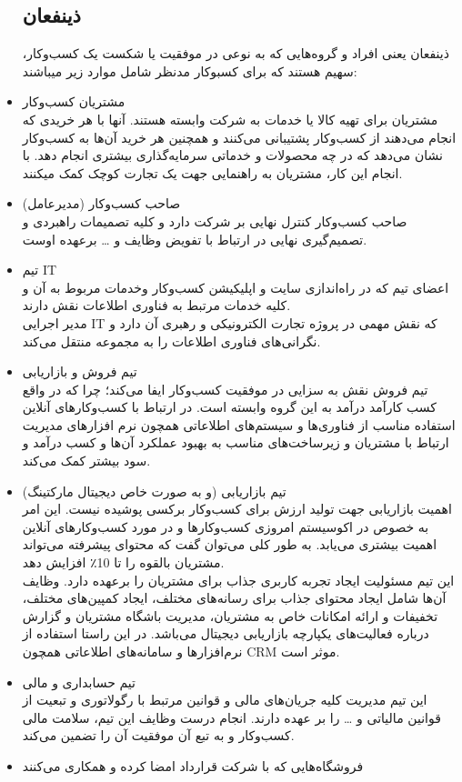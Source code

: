 \documentclass[14pt]{article}
\begin{document}
\begin{flushright}
\begin{itemize}
\subsection{ ذینفعان}
ذینفعان یعنی افراد و گروه‌هایی که به نوعی در موفقیت یا شکست یک کسب‌وکار، سهیم هستند که برای کسبوکار مدنظر شامل موارد زیر میباشند:\\
\item مشتریان کسب‌و‌کار‌ \\
مشتریان برای تهیه کالا یا خدمات به شرکت وابسته هستند. آنها با هر خریدی که انجام می‌دهند از کسب‌وکار پشتیبانی می‌کنند و همچنین هر خرید آن‌ها به کسب‌وکار نشان می‌دهد که در چه محصولات و خدماتی سرمایه‌گذاری بیشتری انجام دهد. با انجام این کار، مشتریان به راهنمایی جهت یک تجارت کوچک کمک میکنند.
\item صاحب کسب‌وکار (مدیرعامل)\\
صاحب کسب‌وکار کنترل نهایی بر شرکت دارد و کلیه تصمیمات راهبردی و تصمیم‌گیری نهایی در ارتباط با تفویض وظایف و … برعهده اوست.\\
\item تیم IT \\
 اعضای تیم که در راه‌اندازی سایت و اپلیکیشن کسب‌وکار وخدمات مربوط به آن و کلیه خدمات مرتبط به فناوری اطلاعات نقش دارند.\\
مدیر اجرایی IT که نقش مهمی در پروژه تجارت الکترونیکی و رهبری آن دارد و نگرانی‌های فناوری اطلاعات را به مجموعه منتقل می‌کند. \\
\item تیم فروش و بازاریابی\\
تیم فروش نقش به سزایی در موفقیت کسب‌وکار ایفا می‌کند؛ چرا که در واقع کسب کارآمد درآمد به این گروه وابسته است. در ارتباط با کسب‌وکارهای آنلاین استفاده مناسب از فناوری‌ها و سیستم‌های اطلاعاتی همچون نرم افزارهای مدیریت ارتباط با مشتریان   و زیرساخت‌های مناسب به بهبود عملکرد آن‌ها و کسب درآمد و سود بیشتر کمک می‌کند.\\
\item تیم بازاریابی (و به صورت خاص دیجیتال مارکتینگ)\\
اهمیت بازاریابی جهت تولید ارزش برای کسب‌وکار برکسی پوشیده نیست. این امر به خصوص در اکوسیستم امروزی کسب‌وکارها و در مورد کسب‌وکارهای آنلاین اهمیت بیشتری می‌یابد. به طور کلی می‌توان گفت که محتوای پیشرفته می‌تواند مشتریان بالقوه را تا 10٪ افزایش دهد.\\
این تیم مسئولیت ایجاد تجربه کاربری جذاب برای مشتریان را برعهده دارد. وظایف آن‌ها شامل ایجاد محتوای جذاب برای رسانه‌های مختلف، ایجاد کمپین‌های مختلف، تخفیفات و ارائه امکانات خاص به مشتریان، مدیریت باشگاه مشتریان و گزارش درباره فعالیت‌های یکپارچه بازاریابی دیجیتال می‌باشد. در این راستا استفاده از نرم‌افزارها و سامانه‌های اطلاعاتی همچون CRM موثر است.\\
\item تیم حسابداری و مالی\\ 
این تیم مدیریت کلیه جریان‌های مالی و قوانین مرتبط با رگولاتوری و تبعیت از قوانین مالیاتی و … را بر عهده دارند. انجام درست وظایف این تیم، ‌سلامت مالی کسب‌وکار و به تبع آن موفقیت آن را تضمین می‌کند.\\
\item فروشگاه‌هایی که با شرکت قرارداد امضا کرده و همکاری می‌کنند \\


\end{itemize}
\end{flushright}
\end{document}
